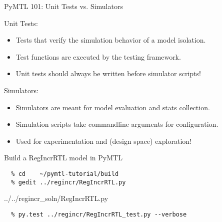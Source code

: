 \begin{frame}{PyMTL 101: Unit Tests vs. Simulators}

Unit Tests: 
\begin{itemize}
  \item Tests that verify the simulation behavior of a model isolation.
  \item Test functions are executed by the  testing framework.
  \item Unit tests should always be written before simulator scripts!
\end{itemize}

\vspace{0.2in}

Simulators: 
\begin{itemize}
  \item Simulators are meant for model evaluation and stats collection.
  \item Simulation scripts take commandline arguments for configuration.
  \item Used for experimentation and (design space) exploration!
\end{itemize}

\end{frame}

\begin{task}\begin{frame}[fragile]{Build a RegIncrRTL model in PyMTL}
\vspace{-0.25in}
\begin{verbatim}
  % cd    ~/pymtl-tutorial/build
  % gedit ../regincr/RegIncrRTL.py
\end{verbatim}

\vspace{-0.3in}
%
{../../regincr_soln/RegIncrRTL.py}%

\vspace{-0.3in}
\begin{verbatim}
  % py.test ../regincr/RegIncrRTL_test.py --verbose
\end{verbatim}
\end{frame}
\end{task}

